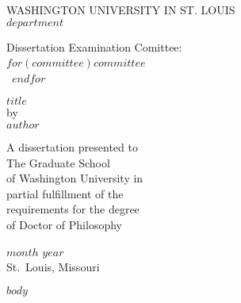 \documentclass[12pt]{memoir}
\begin{document}
\clearpage
{
\thispagestyle{empty}
\centering
WASHINGTON UNIVERSITY IN ST. LOUIS\\[\baselineskip]

$department$

\vfill

Dissertation Examination Comittee:\\
$for(committee)$$committee$~\\~$endfor$

\vfill

$title$\\
by\\
$author$

\vfill

A dissertation presented to\\
The Graduate School\\
of Washington University in\\
partial fulfillment of the\\
requirements for the degree\\
of Doctor of Philosophy

\vfill

$month$ $year$\\
St.~Louis, Missouri

}

\clearpage

$body$
\end{document}
